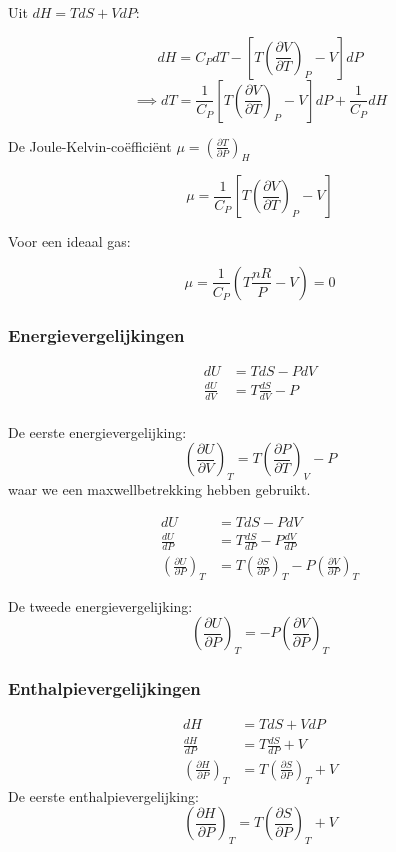 Uit \(dH = TdS + VdP\):

\[
dH = C_P dT - \left[ T\left(\frac{\partial V}{\partial T}\right)_P - V \right] dP
\]
\[
\implies dT = \frac{1}{C_P}\left[ T\left(\frac{\partial V}{\partial T}\right)_P - V \right] dP + \frac{1}{C_P}dH
\]

De Joule-Kelvin-coëfficiënt \(\mu = \left(\frac{\partial T}{\partial P}\right)_H\)

\[\mu = \frac{1}{C_P}\left[ T\left(\frac{\partial V}{\partial T}\right)_P - V \right]\]

Voor een ideaal gas:

\[\mu = \frac{1}{C_P} \left( T\frac{nR}{P} - V \right) = 0\]

\subsubsection{Energievergelijkingen}

\begin{align*}
    dU &= TdS - PdV \\
    \frac{dU}{dV} &= T \frac{d S}{d V}- P \\
\end{align*}

De eerste energievergelijking:
\[
\boxed{\left(\frac{\partial U}{\partial V}\right)_T = T \left(\frac{\partial P}{\partial T}\right)_V - P}
\]
waar we een maxwellbetrekking hebben gebruikt.

\begin{align*}
    dU &= TdS - PdV \\
    \frac{dU}{dP} &= T \frac{d S}{d P}- P \frac{dV}{dP} \\
    \left(\frac{\partial U}{\partial P}\right)_T &= T \left(\frac{\partial S}{\partial P}\right)_T - P \left(\frac{\partial V}{\partial P}\right)_T
\end{align*}

De tweede energievergelijking:
\[
\boxed{\left(\frac{\partial U}{\partial P}\right)_T = -P \left(\frac{\partial V}{\partial P}\right)_T}
\]

\subsubsection{Enthalpievergelijkingen}

\begin{align*}
dH &= TdS + VdP \\
\frac{dH}{dP} &= T \frac{d S}{d P}+ V  \\
\left(\frac{\partial H}{\partial P}\right)_T &= T \left(\frac{\partial S}{\partial P}\right)_T + V 
\end{align*}
De eerste enthalpievergelijking:
\[\boxed{\left(\frac{\partial H}{\partial P}\right)_T = T \left(\frac{\partial S}{\partial P}\right)_T + V}\]

